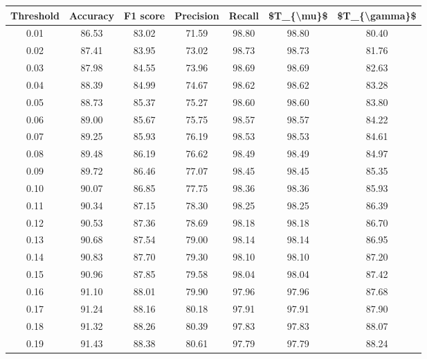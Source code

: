 \begin{tabular}{|c|c|c|c|c|c|c|}
\hline
 Threshold &  Accuracy &  F1 score &  Precision &  Recall &  \$T\_\{\textbackslash mu\}\$ &  \$T\_\{\textbackslash gamma\}\$ \\
\hline
      0.01 &     86.53 &     83.02 &      71.59 &   98.80 &      98.80 &         80.40 \\
      0.02 &     87.41 &     83.95 &      73.02 &   98.73 &      98.73 &         81.76 \\
      0.03 &     87.98 &     84.55 &      73.96 &   98.69 &      98.69 &         82.63 \\
      0.04 &     88.39 &     84.99 &      74.67 &   98.62 &      98.62 &         83.28 \\
      0.05 &     88.73 &     85.37 &      75.27 &   98.60 &      98.60 &         83.80 \\
      0.06 &     89.00 &     85.67 &      75.75 &   98.57 &      98.57 &         84.22 \\
      0.07 &     89.25 &     85.93 &      76.19 &   98.53 &      98.53 &         84.61 \\
      0.08 &     89.48 &     86.19 &      76.62 &   98.49 &      98.49 &         84.97 \\
      0.09 &     89.72 &     86.46 &      77.07 &   98.45 &      98.45 &         85.35 \\
      0.10 &     90.07 &     86.85 &      77.75 &   98.36 &      98.36 &         85.93 \\
      0.11 &     90.34 &     87.15 &      78.30 &   98.25 &      98.25 &         86.39 \\
      0.12 &     90.53 &     87.36 &      78.69 &   98.18 &      98.18 &         86.70 \\
      0.13 &     90.68 &     87.54 &      79.00 &   98.14 &      98.14 &         86.95 \\
      0.14 &     90.83 &     87.70 &      79.30 &   98.10 &      98.10 &         87.20 \\
      0.15 &     90.96 &     87.85 &      79.58 &   98.04 &      98.04 &         87.42 \\
      0.16 &     91.10 &     88.01 &      79.90 &   97.96 &      97.96 &         87.68 \\
      0.17 &     91.24 &     88.16 &      80.18 &   97.91 &      97.91 &         87.90 \\
      0.18 &     91.32 &     88.26 &      80.39 &   97.83 &      97.83 &         88.07 \\
      0.19 &     91.43 &     88.38 &      80.61 &   97.79 &      97.79 &         88.24 \\

\end{tabular}
